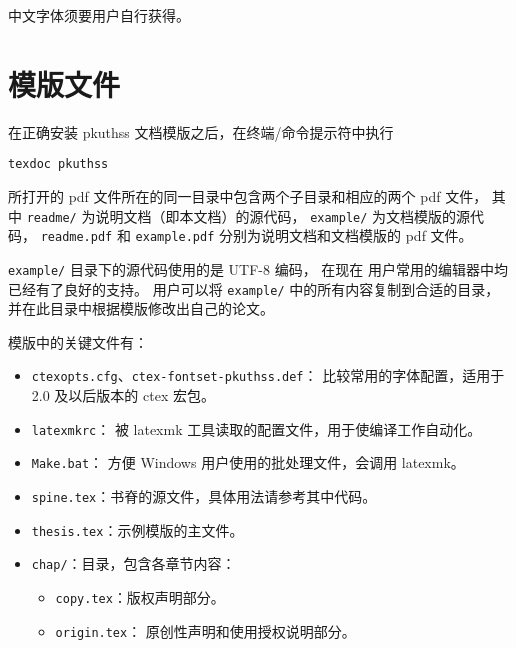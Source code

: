 中文字体须要用户自行获得。

\section{模版文件}\label{sec:doc-dir}

在正确安装 pkuthss 文档模版之后，在终端/命令提示符中执行
\begin{Verbatim}
texdoc pkuthss
\end{Verbatim}
所打开的 pdf 文件所在的同一目录中包含两个子目录和相应的两个 pdf 文件，
其中 \verb|readme/| 为说明文档（即本文档）的源代码，%
\verb|example/| 为文档模版的源代码，%
\verb|readme.pdf| 和 \verb|example.pdf|
分别为说明文档和文档模版的 pdf 文件。

\verb|example/| 目录下的源代码使用的是 UTF-8 编码，
在现在  用户常用的编辑器中均已经有了良好的支持。
用户可以将 \verb|example/| 中的所有内容复制到合适的目录，
并在此目录中根据模版修改出自己的论文。


模版中的关键文件有：
\begin{itemize}
	\item \verb|ctexopts.cfg|、\verb|ctex-fontset-pkuthss.def|：
		比较常用的字体配置，适用于 2.0 及以后版本的
		ctex 宏包。
	\item \verb|latexmkrc|：
		被 latexmk 工具读取的配置文件，用于使编译工作自动化。
	\item \verb|Make.bat|：%
		方便 Windows 用户使用的批处理文件，会调用 latexmk。
	\item \verb|spine.tex|：书脊的源文件，具体用法请参考其中代码。
	\item \verb|thesis.tex|：示例模版的主文件。

	\item \verb|chap/|：目录，包含各章节内容：
	\begin{itemize}
		\item \verb|copy.tex|：版权声明部分。
		\item \verb|origin.tex|：
			原创性声明和使用授权说明部分。
	\end{itemize}
\end{itemize}

